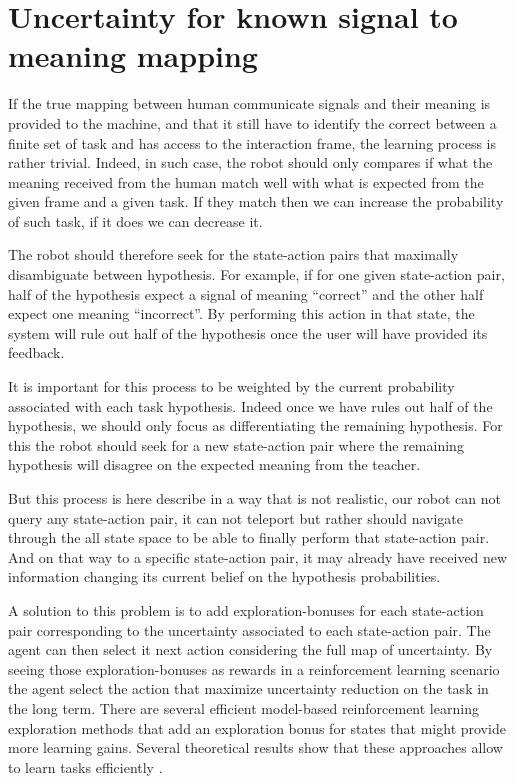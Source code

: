 \section{Uncertainty for known signal to meaning mapping}

If the true mapping between human communicate signals and their meaning is provided to the machine, and that it still have to identify the correct between a finite set of task and has access to the interaction frame, the learning process is rather trivial. Indeed, in such case, the robot should only compares if what the meaning received from the human match well with what is expected from the given frame and a given task. If they match then we can increase the probability of such task, if it does we can decrease it.

The robot should therefore seek for the state-action pairs that maximally disambiguate between hypothesis. For example, if for one given state-action pair, half of the hypothesis expect a signal of meaning ``correct'' and the other half expect one meaning ``incorrect''. By performing this action in that state, the system will rule out half of the hypothesis once the user will have provided its feedback. 

It is important for this process to be weighted by the current probability associated with each task hypothesis. Indeed once we have rules out half of the hypothesis, we should only focus as differentiating the remaining hypothesis. For this the robot should seek for a new state-action pair where the remaining hypothesis will disagree on the expected meaning from the teacher.

But this process is here describe in a way that is not realistic, our robot can not query any state-action pair, it can not teleport but rather should navigate through the all state space to be able to finally perform that state-action pair. And on that way to a specific state-action pair, it may already have received new information changing its current belief on the hypothesis probabilities.

A solution to this problem is to add exploration-bonuses for each state-action pair corresponding to the uncertainty associated to each state-action pair. The agent can then select it next action considering the full map of uncertainty. By seeing those exploration-bonuses as rewards in a reinforcement learning scenario the agent select the action that maximize uncertainty reduction on the task in the long term. There are several efficient model-based reinforcement learning exploration methods that add an exploration bonus for states that might provide more learning gains. Several theoretical results show that these approaches allow to learn tasks efficiently \cite{brafman2003r,kolter2009near}. 

